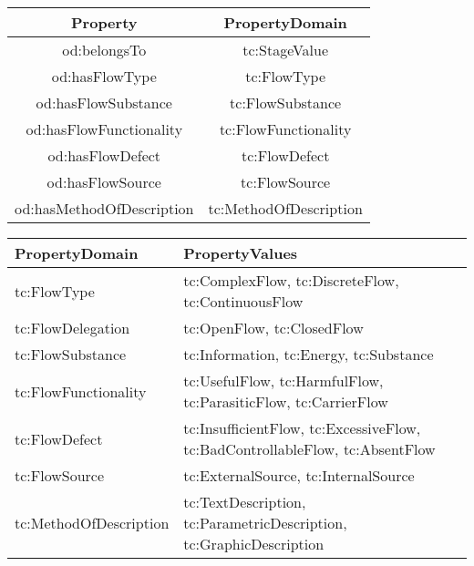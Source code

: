 \documentclass[a4paper,11pt]{article}
\begin{document}
\begin{itemize}
    \begin{center}
    \begin{tabular}{|c|c|}\hline
        Property & PropertyDomain \\\hline
        od:belongsTo & tc:StageValue \\
        od:hasFlowType & tc:FlowType  \\
        od:hasFlowSubstance & tc:FlowSubstance  \\
        od:hasFlowFunctionality & tc:FlowFunctionality  \\
        od:hasFlowDefect & tc:FlowDefect  \\
        od:hasFlowSource & tc:FlowSource  \\
        od:hasMethodOfDescription & tc:MethodOfDescription \\\hline 
    \end{tabular}
    \end{center}

    \begin{center}
    \begin{tabular}{|l|p{10cm}|}\hline
        PropertyDomain & PropertyValues \\\hline
        tc:FlowType & tc:ComplexFlow, tc:DiscreteFlow, tc:ContinuousFlow \\
        tc:FlowDelegation & tc:OpenFlow, tc:ClosedFlow \\
        tc:FlowSubstance & tc:Information, tc:Energy, tc:Substance \\
        tc:FlowFunctionality & tc:UsefulFlow, tc:HarmfulFlow, tc:ParasiticFlow,
        tc:CarrierFlow  \\
        tc:FlowDefect & tc:InsufficientFlow, tc:ExcessiveFlow,
        tc:BadControllableFlow, tc:AbsentFlow \\ 
        tc:FlowSource & tc:ExternalSource, tc:InternalSource  \\
        tc:MethodOfDescription & tc:TextDescription, tc:ParametricDescription,
        tc:GraphicDescription \\\hline 
    \end{tabular}
    \end{center}


\end{itemize}
\end{document}
